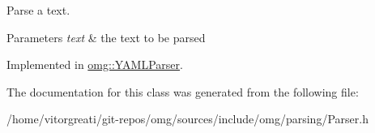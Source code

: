 Parse a text. 


\begin{DoxyParams}{Parameters}
{\em text} & the text to be parsed \\
\hline
\end{DoxyParams}


Implemented in \mbox{\hyperlink{classomg_1_1_y_a_m_l_parser_a625f697e850b8d027095d74f7fe65acc}{omg\+::\+Y\+A\+M\+L\+Parser}}.



The documentation for this class was generated from the following file\+:\begin{DoxyCompactItemize}
\item 
/home/vitorgreati/git-\/repos/omg/sources/include/omg/parsing/Parser.\+h\end{DoxyCompactItemize}
